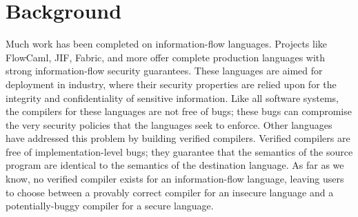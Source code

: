 \section{Background}

Much work has been completed on information-flow languages.  Projects
like FlowCaml\cite{simonet2003flow}, JIF\cite{myers2000protecting},
Fabric\cite{liu2009fabric}, and more offer complete production languages
with strong information-flow security guarantees.  These languages are
aimed for deployment in industry, where their security properties are
relied upon for the integrity and confidentiality of sensitive
information.  Like all software systems, the compilers for these
languages are not free of bugs; these bugs can compromise the very
security policies that the languages seek to enforce.  Other languages
have addressed this problem by building verified
compilers\cite{leroy2012compcert,okuma2003executing,chlipala2010verified,berghofer2004extracting,strecker2002formal,necula1998design,necula2002proof}.
Verified compilers are free of implementation-level bugs; they guarantee
that the semantics of the source program are identical to the semantics
of the destination language\cite{necula1998design}.  As far as we know,
no verified compiler exists for an information-flow language, leaving
users to choose between a provably correct compiler for an insecure
language and a potentially-buggy compiler for a secure language.  


